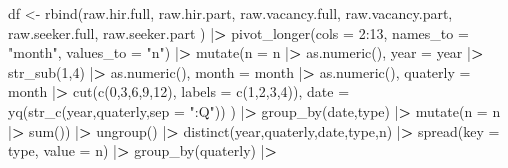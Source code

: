 \documentclass[
]{book}
\newenvironment{Shaded}{\begin{snugshade}}{\end{snugshade}}
\newcommand{\AttributeTok}[1]{\textcolor[rgb]{0.77,0.63,0.00}{#1}}
\newcommand{\DecValTok}[1]{\textcolor[rgb]{0.00,0.00,0.81}{#1}}
\newcommand{\ErrorTok}[1]{\textcolor[rgb]{0.64,0.00,0.00}{\textbf{#1}}}
\newcommand{\FunctionTok}[1]{\textcolor[rgb]{0.00,0.00,0.00}{#1}}
\newcommand{\NormalTok}[1]{#1}
\newcommand{\OtherTok}[1]{\textcolor[rgb]{0.56,0.35,0.01}{#1}}
\newcommand{\SpecialCharTok}[1]{\textcolor[rgb]{0.00,0.00,0.00}{#1}}
\newcommand{\StringTok}[1]{\textcolor[rgb]{0.31,0.60,0.02}{#1}}
\begin{document}
\begin{Shaded}
\begin{Highlighting}[]
\NormalTok{df }\OtherTok{\textless{}{-}}
  \FunctionTok{rbind}\NormalTok{(raw.hir.full,}
\NormalTok{        raw.hir.part,}
\NormalTok{        raw.vacancy.full,}
\NormalTok{        raw.vacancy.part,}
\NormalTok{        raw.seeker.full,}
\NormalTok{        raw.seeker.part}
\NormalTok{        ) }\SpecialCharTok{|}\ErrorTok{\textgreater{}} 
  \FunctionTok{pivot\_longer}\NormalTok{(}\AttributeTok{cols =} \DecValTok{2}\SpecialCharTok{:}\DecValTok{13}\NormalTok{,}
               \AttributeTok{names\_to =} \StringTok{"month"}\NormalTok{,}
               \AttributeTok{values\_to =} \StringTok{"n"}\NormalTok{) }\SpecialCharTok{|}\ErrorTok{\textgreater{}} 
  \FunctionTok{mutate}\NormalTok{(}\AttributeTok{n =}\NormalTok{ n }\SpecialCharTok{|}\ErrorTok{\textgreater{}} \FunctionTok{as.numeric}\NormalTok{(),}
         \AttributeTok{year =}\NormalTok{ year }\SpecialCharTok{|}\ErrorTok{\textgreater{}} \FunctionTok{str\_sub}\NormalTok{(}\DecValTok{1}\NormalTok{,}\DecValTok{4}\NormalTok{) }\SpecialCharTok{|}\ErrorTok{\textgreater{}} \FunctionTok{as.numeric}\NormalTok{(),}
         \AttributeTok{month =}\NormalTok{ month }\SpecialCharTok{|}\ErrorTok{\textgreater{}} \FunctionTok{as.numeric}\NormalTok{(),}
         \AttributeTok{quaterly =}\NormalTok{ month }\SpecialCharTok{|}\ErrorTok{\textgreater{}} \FunctionTok{cut}\NormalTok{(}\FunctionTok{c}\NormalTok{(}\DecValTok{0}\NormalTok{,}\DecValTok{3}\NormalTok{,}\DecValTok{6}\NormalTok{,}\DecValTok{9}\NormalTok{,}\DecValTok{12}\NormalTok{), }\AttributeTok{labels =} \FunctionTok{c}\NormalTok{(}\DecValTok{1}\NormalTok{,}\DecValTok{2}\NormalTok{,}\DecValTok{3}\NormalTok{,}\DecValTok{4}\NormalTok{)),}
         \AttributeTok{date =} \FunctionTok{yq}\NormalTok{(}\FunctionTok{str\_c}\NormalTok{(year,quaterly,}\AttributeTok{sep =} \StringTok{":Q"}\NormalTok{))}
\NormalTok{         ) }\SpecialCharTok{|}\ErrorTok{\textgreater{}} 
  \FunctionTok{group\_by}\NormalTok{(date,type) }\SpecialCharTok{|}\ErrorTok{\textgreater{}} 
  \FunctionTok{mutate}\NormalTok{(}\AttributeTok{n =}\NormalTok{ n }\SpecialCharTok{|}\ErrorTok{\textgreater{}} \FunctionTok{sum}\NormalTok{()) }\SpecialCharTok{|}\ErrorTok{\textgreater{}} 
  \FunctionTok{ungroup}\NormalTok{() }\SpecialCharTok{|}\ErrorTok{\textgreater{}} 
  \FunctionTok{distinct}\NormalTok{(year,quaterly,date,type,n) }\SpecialCharTok{|}\ErrorTok{\textgreater{}} 
  \FunctionTok{spread}\NormalTok{(}\AttributeTok{key =}\NormalTok{ type, }\AttributeTok{value =}\NormalTok{ n) }\SpecialCharTok{|}\ErrorTok{\textgreater{}} 
  \FunctionTok{group\_by}\NormalTok{(quaterly) }\SpecialCharTok{|}\ErrorTok{\textgreater{}} 

\end{Highlighting}
\end{Shaded}
\end{document}
